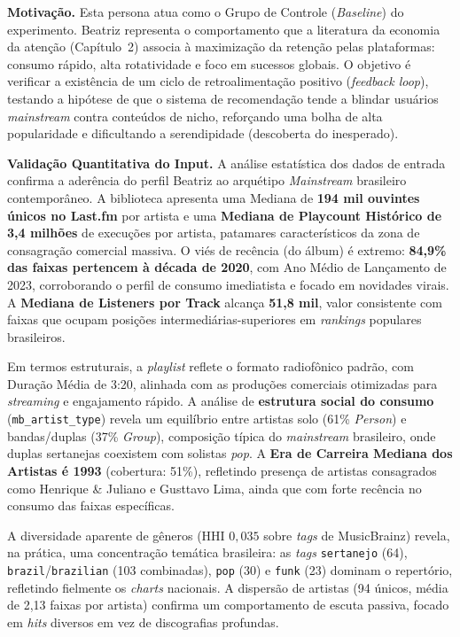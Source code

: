 \documentclass[12pt, %
openright,
oneside, %
a4paper,    %
english,   %
brazil]{facom-ufu-abntex2}
\begin{document}
\textbf{Motivação.} Esta persona atua como o Grupo de Controle (\emph{Baseline})
do experimento. Beatriz representa o comportamento que a literatura da economia
da atenção (Capítulo~2) associa à maximização da retenção
pelas plataformas: consumo rápido, alta rotatividade e foco
em sucessos globais. O objetivo é verificar a existência de um ciclo de
retroalimentação positivo (\emph{feedback loop}), testando a hipótese de que o
sistema de recomendação tende a blindar usuários \emph{mainstream} contra
conteúdos de nicho, reforçando uma bolha de alta popularidade e dificultando a
serendipidade (descoberta do inesperado).

\textbf{Validação Quantitativa do Input.} A análise estatística dos dados de
entrada confirma a aderência do perfil Beatriz ao arquétipo \emph{Mainstream}
brasileiro contemporâneo. A biblioteca apresenta uma Mediana de \textbf{194 mil
ouvintes únicos no Last.fm} por artista e uma \textbf{Mediana de Playcount
Histórico de 3,4 milhões} de execuções por artista, patamares característicos
da zona de consagração comercial massiva. O viés de recência (do álbum) é
extremo: \textbf{84,9\% das faixas pertencem à década de 2020}, com Ano Médio de
Lançamento de 2023, corroborando o perfil de consumo imediatista e focado em
novidades virais. A \textbf{Mediana de Listeners por Track} alcança \textbf{51,8
mil}, valor consistente com faixas que ocupam posições intermediárias-superiores
em \emph{rankings} populares brasileiros.

Em termos estruturais, a \emph{playlist} reflete o formato radiofônico padrão,
com Duração Média de 3:20, alinhada com as produções comerciais otimizadas para
\emph{streaming} e engajamento rápido. A análise de \textbf{estrutura social do
consumo} (\texttt{mb\_artist\_type}) revela um equilíbrio entre artistas solo
(61\% \emph{Person}) e bandas/duplas (37\% \emph{Group}), composição típica do
\emph{mainstream} brasileiro, onde duplas sertanejas coexistem com solistas
\emph{pop}. A \textbf{Era de Carreira Mediana dos Artistas é 1993} (cobertura:
51\%), refletindo presença de artistas consagrados como Henrique \& Juliano e
Gusttavo Lima, ainda que com forte recência no consumo das faixas específicas.

A diversidade aparente de gêneros (HHI $0{,}035$ sobre \emph{tags} de
MusicBrainz) revela, na prática, uma concentração temática brasileira: as
\emph{tags} \texttt{sertanejo} (64), \texttt{brazil}/\texttt{brazilian} (103
combinadas), \texttt{pop} (30) e \texttt{funk} (23) dominam o repertório,
refletindo fielmente os \emph{charts} nacionais. A dispersão de artistas (94
únicos, média de 2,13 faixas por artista) confirma um comportamento de escuta
passiva, focado em \emph{hits} diversos em vez de discografias profundas.
\end{document}
